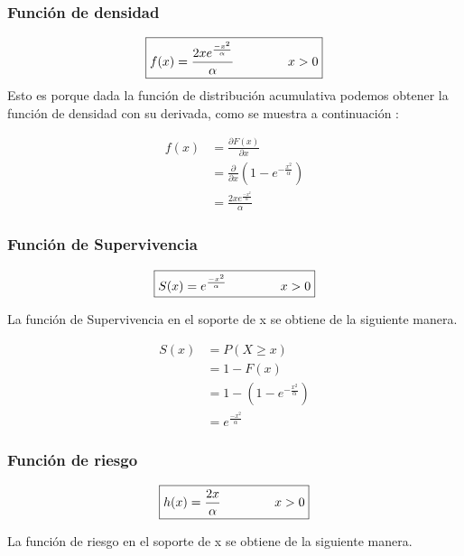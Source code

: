 \documentclass[10pt,a4paper]{article}
\begin{document}
\subsubsection*{Funci\'on de densidad}

\begin{equation*}
\boxed{
f(x) = \frac{2xe^{\frac{-x^2}{\alpha}}}{\alpha} \hspace{1.5cm} x > 0}
\end{equation*}
Esto es porque dada la función de distribución acumulativa podemos obtener la función de densidad con su derivada, como se muestra a continuación : 

\begin{align*}
f(x) &= \frac{\partial F(x)}{\partial x}	 \\
	&=	\frac{\partial}{\partial x} \left(   1 - e^ {-\frac{x^2}{\alpha}} \right)\\
	&= \frac{2xe^{\frac{-x^2}{\alpha}}}{\alpha}
\end{align*}


\subsubsection*{Funci\'on de Supervivencia}
\begin{equation*}
\boxed{
S(x) = e^{\frac{-x^2}{\alpha}} \hspace{1.5cm} x > 0}
\end{equation*}

La función de Supervivencia en el soporte de x se obtiene de la siguiente manera.

\begin{align*}
S(x) &= P(X \geqslant x) \\
     &= 1 - F(x) \\
     &= 1 - \left(1 - e^ {-\frac{x^2}{\alpha}} \right)  \\
     &= e^{\frac{-x^2}{\alpha}}
\end{align*}


\subsubsection*{Funci\'on de riesgo}
\begin{equation*}
\boxed{
h(x) = \frac{2x}{\alpha} \hspace{1.5cm} x > 0}
\end{equation*}

La función de riesgo en el soporte de x se obtiene de la siguiente manera.
\end{document}
